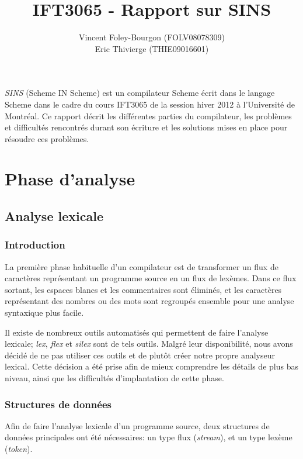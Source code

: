 \documentclass[11pt]{report}
\begin{document}
\title{IFT3065 - Rapport sur SINS}
\author{Vincent Foley-Bourgon (FOLV08078309) \\
Eric Thivierge (THIE09016601)}
\maketitle

\abstract

\emph{SINS} (Scheme IN Scheme) est un compilateur Scheme écrit dans le
langage Scheme dans le cadre du cours IFT3065 de la session hiver 2012
à l'Université de Montréal.  Ce rapport décrit les différentes parties
du compilateur, les problèmes et difficultés rencontrés durant son
écriture et les solutions mises en place pour résoudre ces problèmes.

\chapter{Phase d'analyse}

\section{Analyse lexicale}

\subsection{Introduction}
La première phase habituelle d'un compilateur est de transformer un
flux de caractères représentant un programme source en un flux de
lexèmes.  Dans ce flux sortant, les espaces blancs et les commentaires
sont éliminés, et les caractères représentant des nombres ou des mots
sont regroupés ensemble pour une analyse syntaxique plus facile.

Il existe de nombreux outils automatisés qui permettent de faire
l'analyse lexicale; \emph{lex}, \emph{flex} et \emph{silex} sont de
tels outils.  Malgré leur disponibilité, nous avons décidé de ne pas
utiliser ces outils et de plutôt créer notre propre analyseur lexical.
Cette décision a été prise afin de mieux comprendre les détails de
plus bas niveau, ainsi que les difficultés d'implantation de cette
phase.

\subsection{Structures de données}

Afin de faire l'analyse lexicale d'un programme source, deux
structures de données principales ont été nécessaires: un type flux
(\emph{stream}), et un type lexème (\emph{token}).
\end{document}
